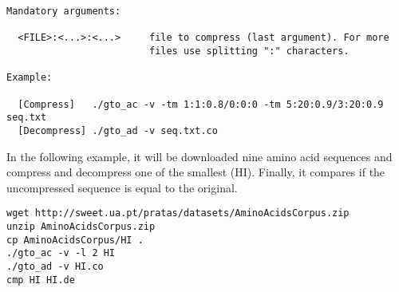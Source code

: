 \begin{lstlisting}
Mandatory arguments:                                                   
                                                                       
  <FILE>:<...>:<...>     file to compress (last argument). For more    
                         files use splitting ":" characters.         
                                                                       
Example:                                                               
                                                                       
  [Compress]   ./gto_ac -v -tm 1:1:0.8/0:0:0 -tm 5:20:0.9/3:20:0.9 seq.txt 
  [Decompress] ./gto_ad -v seq.txt.co  
\end{lstlisting}
In the following example, it will be downloaded nine amino acid sequences and compress and decompress one of the smallest (HI). Finally, it compares if the uncompressed sequence is equal to the original.
\begin{lstlisting}
wget http://sweet.ua.pt/pratas/datasets/AminoAcidsCorpus.zip
unzip AminoAcidsCorpus.zip
cp AminoAcidsCorpus/HI .
./gto_ac -v -l 2 HI
./gto_ad -v HI.co
cmp HI HI.de
\end{lstlisting}